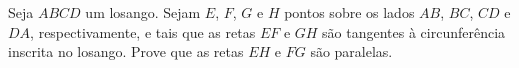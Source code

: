 Seja $ABCD$ um losango. Sejam $E$, $F$, $G$ e $H$ pontos sobre os lados $AB$, $BC$, $CD$ e $DA$, respectivamente, e tais que as retas $EF$ e $GH$ são tangentes à circunferência inscrita no losango.
Prove que as retas $EH$ e $FG$ são paralelas.